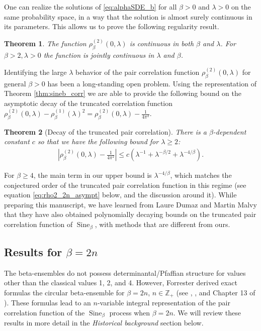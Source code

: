 \documentclass[12pt]{article}
\newtheorem{theorem}{Theorem}
\theoremstyle{definition} %
\newcommand{\ZZ}{{\mathbb Z}}
\theoremstyle{remark} %
\newcommand{\Sineb}{\operatorname{Sine}_{\beta}}
\begin{document}
One can realize the solutions of \eqref{eq:alphaSDE_b} for all $\beta>0$ and $\lambda>0$ on the same probability space, in a way that the solution is almost surely continuous in its parameters. This allows us to prove the following regularity result. 
\begin{theorem}\label{thm:beta_cont}
    The function $\rho_{\beta}^{(2)}(0,\lambda)$ is continuous in both $\beta$ and $\lambda$.  For $\beta>2, \lambda>0$ the function is jointly continuous in $\lambda$ and $\beta$. 
\end{theorem}
Identifying the large $\lambda$ behavior of 
the  pair correlation function $\rho^{(2)}_\beta(0,\lambda)$ for general $\beta>0$ has been a long-standing open problem. Using the representation of Theorem \ref{thm:sineb_corr} we are able to provide the following bound on the asymptotic decay of the truncated correlation function $\rho^{(2)}_\beta(0,\lambda)-\rho^{(1)}_\beta(\lambda)^2=\rho^{(2)}_\beta(0,\lambda)-\frac{1}{4\pi^2}$. 
\begin{theorem}[Decay of the truncated pair correlation]\label{thm:large_lambda}
There is a $\beta$-dependent constant $c$ so that we have the following bound for $\lambda\ge 2$: 
\begin{align}\label{eq:large_lambda}
     \left|\rho^{(2)}_\beta(0,\lambda)-\frac{1}{4\pi^2}\right|\le c\left(\lambda^{-1}+\lambda^{-\beta/2}+\lambda^{-4/\beta}\right).
\end{align} 
\end{theorem}
For $\beta\ge 4$, the main term in our upper bound is $\lambda^{-4/\beta}$, which matches the conjectured order of the truncated pair correlation function in this regime (see equation \eqref{eq:rho2_2n_asympt} below, and the discussion around it). While preparing this manuscript, we have learned from Laure Dumaz and Martin Malvy \cite{DM2025} that they have also obtained polynomially decaying bounds on the truncated pair correlation function of $\Sineb$, with methods that are different from ours. 

\subsection*{Results for $\beta=2n$}

The beta-ensembles do not possess determinantal/Pfaffian structure for values other than the classical values 1, 2, and 4. However,  Forrester derived exact formulas  the circular beta-ensemble for $\beta=2n$, $n\in \ZZ_+$ (see \cite{Forrester_1992}, \cite{Forrester_1994}, and Chapter 13 of \cite{ForBook}). These formulas lead to an $n$-variable integral representation of the pair correlation function of the $\Sineb$ process when $\beta=2n$. We will review these results in more detail in the \textit{Historical background} section below.
\end{document}
